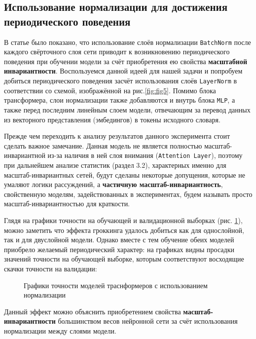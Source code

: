 \documentclass{article}
\begin{document}
\subsection{Использование нормализации для достижения периодического поведения}
В статье \cite{on_periodic_beh} было показано, что использование слоёв нормализации \verb|BatchNorm| после каждого свёрточного слоя сети приводит к возникновению периодического поведения при обучении модели за счёт приобретения ею свойства \textbf{масштабной инвариантности}.
Воспользуемся данной идеей для нашей задачи и попробуем добиться периодического поведения засчёт использования слоёв \verb|LayerNorm| в соответствии со схемой, изображённой на рис.\ref{fig:fig5}.
Помимо блока трансформера, слои нормализации также добавляются и внутрь блока \verb|MLP|, а также перед последним линейным слоем модели, отвечающим за перевод данных из векторного представления (эмбедингов) в токены исходного словаря. 
\par Прежде чем переходить к анализу результатов данного эксперимента стоит сделать важное замечание. Данная модель не является полностью масштаб-инвариантной из-за наличия в ней слоя внимания (\verb|Attention Layer|), поэтому при дальнейшем анализе статистик (раздел 3.2), характерных именно для масштаб-инвариантных сетей, будут сделаны некоторые допущения, которые не умаляют логики рассуждений, а \textbf{частичную масштаб-инвариантность}, свойственную моделям, задействованных в экспериментах, будем называть просто масштаб-инвариантностью для краткости.
\par Глядя на графики точности на обучающей и валидационной выборках (рис. \ref{fig:fig8}), можно заметить что эффекта гроккинга удалось добиться как для однослойной, так и для двуслойной модели. Однако вместе с тем обучение обеих моделей приобрело желаемый периодический характер: на графиках видны просадки значений точности на обучающей выборке, которым соответствуют восходящие скачки точности на валидации:
\begin{figure}[h]
\centering
{}
\caption{Графики точности моделей траснформеров с использованием нормализации}
\label{fig:fig8}
\end{figure}
\par Данный эффект можно объяснить приобретением свойства \textbf{масштаб-инвариантности} большинством весов нейронной сети за счёт использования нормализации между слоями модели.
\end{document}
